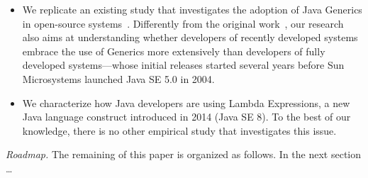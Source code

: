 \documentclass{sig-alternate-05-2015}
\begin{document}
\begin{itemize}
\item We replicate an existing study that investigates the 
adoption of Java Generics in open-source systems~\cite{}. Differently from 
the original work~\cite{}, our research also aims at 
understanding whether developers of recently developed 
systems embrace the use of Generics more extensively 
than developers of fully developed systems---whose initial 
releases started several years before Sun Microsystems 
launched Java SE 5.0 in 2004. 


\item We characterize how Java developers are using Lambda Expressions, 
a new Java language construct introduced in 2014 (Java SE 8). To 
the best of our knowledge, there is no other empirical study that investigates this issue.
\end{itemize}

\emph{Roadmap.} The remaining of this paper is organized 
as follows. {\color{red}In the next section \ldots} 




\end{document}
